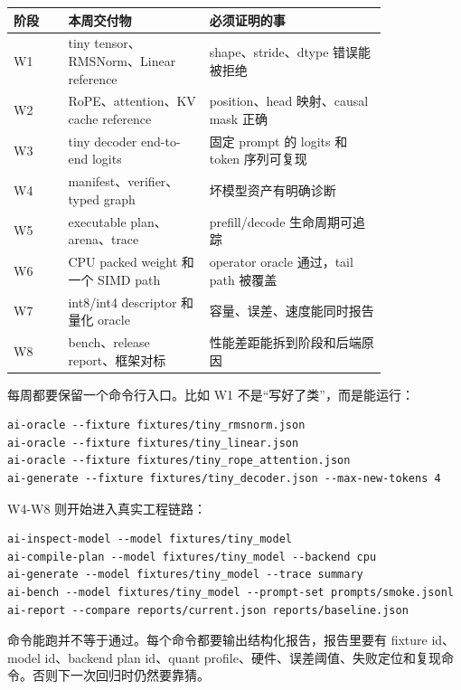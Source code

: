 \begin{center}
\begin{tabular}{p{0.12\linewidth}p{0.31\linewidth}p{0.39\linewidth}}
\toprule
阶段 & 本周交付物 & 必须证明的事 \\
\midrule
W1 & tiny tensor、RMSNorm、Linear reference & shape、stride、dtype 错误能被拒绝 \\
W2 & RoPE、attention、KV cache reference & position、head 映射、causal mask 正确 \\
W3 & tiny decoder end-to-end logits & 固定 prompt 的 logits 和 token 序列可复现 \\
W4 & manifest、verifier、typed graph & 坏模型资产有明确诊断 \\
W5 & executable plan、arena、trace & prefill/decode 生命周期可追踪 \\
W6 & CPU packed weight 和一个 SIMD path & operator oracle 通过，tail path 被覆盖 \\
W7 & int8/int4 descriptor 和量化 oracle & 容量、误差、速度能同时报告 \\
W8 & bench、release report、框架对标 & 性能差距能拆到阶段和后端原因 \\
\bottomrule
\end{tabular}
\end{center}

每周都要保留一个命令行入口。比如 W1 不是“写好了类”，而是能运行：

\begin{lstlisting}[numbers=none,caption={W1-W3 的命令行验收}]
ai-oracle --fixture fixtures/tiny_rmsnorm.json
ai-oracle --fixture fixtures/tiny_linear.json
ai-oracle --fixture fixtures/tiny_rope_attention.json
ai-generate --fixture fixtures/tiny_decoder.json --max-new-tokens 4
\end{lstlisting}

W4-W8 则开始进入真实工程链路：

\begin{lstlisting}[numbers=none,caption={W4-W8 的命令行验收}]
ai-inspect-model --model fixtures/tiny_model
ai-compile-plan --model fixtures/tiny_model --backend cpu
ai-generate --model fixtures/tiny_model --trace summary
ai-bench --model fixtures/tiny_model --prompt-set prompts/smoke.jsonl
ai-report --compare reports/current.json reports/baseline.json
\end{lstlisting}

命令能跑并不等于通过。每个命令都要输出结构化报告，报告里要有 fixture id、model id、backend plan id、quant profile、硬件、误差阈值、失败定位和复现命令。否则下一次回归时仍然要靠猜。


